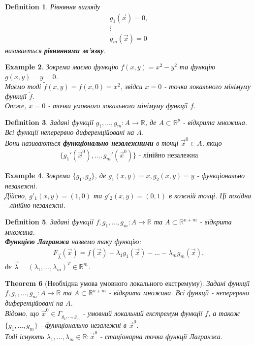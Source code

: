 \documentclass[a4paper, 10pt]{article}
\theoremstyle{theoremdd}
\newtheorem{theorem}{Theorem}[subsection]
\theoremstyle{theoremdd}
\theoremstyle{theoremdd}
\newtheorem{definition}[theorem]{Definition}
\theoremstyle{theoremdd}
\theoremstyle{theoremdd}
\newtheorem{example}[theorem]{Example}
\theoremstyle{theoremdd}
\theoremstyle{theoremdd}
\theoremstyle{theoremdd}
\theoremstyle{theoremdd}
\begin{document}
\begin{definition}
Рівняння вигляду
\begin{align*}
g_1(\vec{x}) = 0,\\
\vdots \\
g_m(\vec{x}) = 0
\end{align*}
називається \textbf{рівняннями зв'язку}.
\end{definition}

\begin{example}
Зокрема маємо функцію $f(x,y) = x^2-y^2$ та функцію $g(x,y) = y = 0$.\\
Маємо тоді $\tilde{f}(x,y) = f(x,0) = x^2$, звідси $x = 0$ - точка локального мінімуму функції $\tilde{f}$.\\
Отже, $x = 0$ - точка умовного локального мінімуму функції $f$.
\end{example}

\begin{definition}
Задані функції $g_1,\dots,g_m: A \to \mathbb{R}$, де $A \subset \mathbb{R}^p$ - відкрита множина. Всі функції неперервно диференційовані на $A$.\\
Вони називаються \textbf{функціонально незалежними} в точці $\vec{x}^0 \in A$, якщо
\begin{align*}
\{g_1'(\vec{x}^0),\dots,g_m'(\vec{x}^0)\} \text{ - лінійно незалежна}
\end{align*}
\end{definition}

\begin{example}
Зокрема $\{g_1,g_2\}$, де $g_1(x,y) = x, g_2(x,y) = y$ - функціонально незалежні.\\
Дійсно, $g'_1(x,y) = (1,0)$ та $g'_2(x,y) = (0,1)$ в кожній точці. Ці похідна - лінійно незалежні.
\end{example}

\begin{definition}
Задані функції $f,g_1,\dots,g_m: A \to \mathbb{R}$ та $A \subset \mathbb{R}^{n+m}$ - відкрита множина.\\
\textbf{Функцією Лагранжа} назвемо таку функцію:
\begin{align*}
F_{\vec{\lambda}}(\vec{x}) = f(\vec{x}) - \lambda_1g_1(\vec{x}) - \dots - \lambda_m g_m(\vec{x}),
\end{align*}
де $\vec{\lambda} = (\lambda_1,\dots,\lambda_m)^T \in \mathbb{R}^m$.
\end{definition}

\begin{theorem}[Необхідна умова умовного локального екстремуму]
Задані функції $f,g_1,\dots,g_m: A \to \mathbb{R}$ та $A \subset \mathbb{R}^{n+m}$ - відкрита множина. Всі функції - неперервно диференційовані на $A$.\\
Відомо, що $\vec{x}^0 \in \Gamma_{g_1,\dots,g_m}$ - умовний локальний екстремум функції $f$, а також $\{g_1,\dots,g_m\}$ - функціонально незалежні в $\vec{x}^0$.\\
Тоді існують $\lambda_1,\dots,\lambda_m \in \mathbb{R}: \vec{x}^0$ - стаціонарна точка функції Лагранжа.
\end{theorem}
\end{document}
